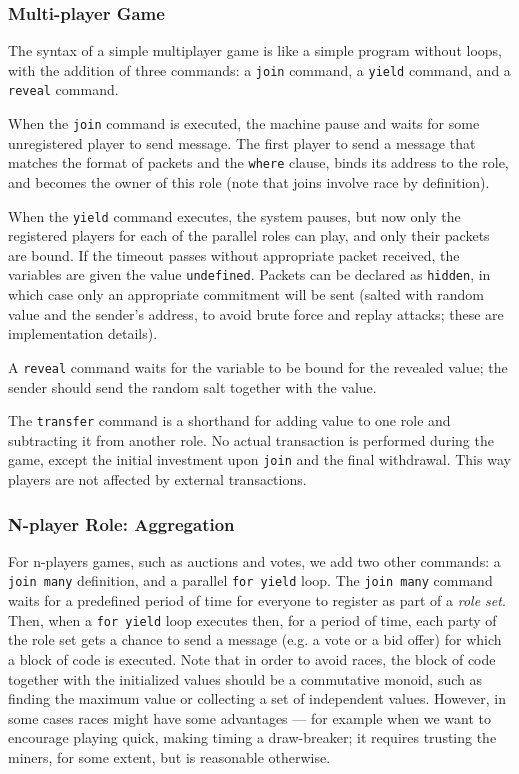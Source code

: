 \documentclass[acmsmall,review,anonymous]{acmart}\settopmatter{printfolios=true,printccs=false,printacmref=false}
\begin{document}
\subsubsection{Multi-player Game}
The syntax of a simple multiplayer game is like a simple program without loops, with the addition of three commands: a \texttt{join} command, a \texttt{yield} command, and a \texttt{reveal} command.

When the \texttt{join} command is executed, the machine pause and waits for some unregistered player to send message. The first player to send a message that matches the format of packets and the \texttt{where} clause, binds its address to the role, and becomes the owner of this role (note that joins involve race by definition).

When the \texttt{yield} command executes, the system pauses, but now only the registered players for each of the parallel roles can play, and only their packets are bound. If the timeout passes without appropriate packet received, the variables are given the value \texttt{undefined}. Packets can be declared as \texttt{hidden}, in which case only an appropriate commitment will be sent (salted with random value and the sender's address, to avoid brute force and replay attacks; these are implementation details).

A \texttt{reveal} command waits for the variable to be bound for the revealed value; the sender should send the random salt together with the value.

The \texttt{transfer} command is a shorthand for adding value to one role and subtracting it from another role. No actual transaction is performed during the game, except the initial investment upon \texttt{join} and the final withdrawal. This way players are not affected by external transactions.

\subsubsection{N-player Role: Aggregation}

For n-players games, such as auctions and votes, we add two other commands: a \texttt{join many} definition, and a parallel \texttt{for yield} loop. The \texttt{join many} command waits for a predefined period of time for everyone to register as part of a \textit{role set}. Then, when a \texttt{for yield} loop executes then, for a period of time, each party of the role set gets a chance to send a message (e.g. a vote or a bid offer) for which a block of code is executed. Note that in order to avoid races, the block of code together with the initialized values should be a commutative monoid, such as finding the maximum value or collecting a set of independent values. However, in some cases races might have some advantages --- for example when we want to encourage playing quick, making timing a draw-breaker; it requires trusting the miners, for some extent, but is reasonable otherwise.
\end{document}
